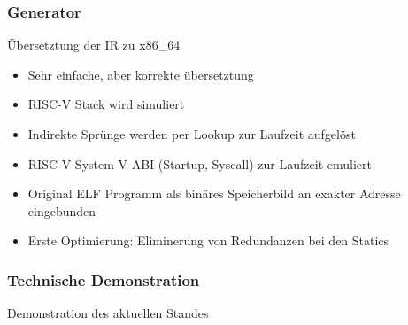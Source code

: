 
\begin{frame}
    \frametitle{Generator}{Übersetztung der IR zu x86\_64}
    \pause{}
    \begin{itemize}
        \item Sehr einfache, aber korrekte übersetztung
              \pause{}
        \item RISC-V Stack wird simuliert %
              \pause{}
        \item Indirekte Sprünge werden per Lookup zur Laufzeit aufgelöst
              \pause{}
        \item RISC-V System-V ABI (Startup, Syscall) zur Laufzeit emuliert
              \pause{}
        \item Original ELF Programm als binäres Speicherbild an exakter Adresse eingebunden
              \pause{}
        \item Erste Optimierung: Eliminerung von Redundanzen bei den Statics
    \end{itemize}
\end{frame}
\clearpage


\begin{frame}
    \frametitle{Technische Demonstration}{Demonstration des aktuellen Standes}

\end{frame}
\clearpage

